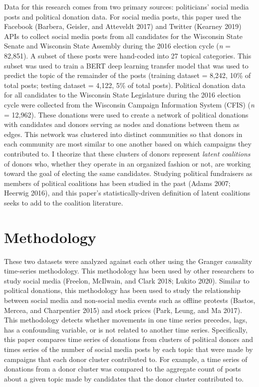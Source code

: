 \documentclass[12pt,]{article}
\begin{document}
Data for this research comes from two primary sources: politicians'
social media posts and political donation data. For social media posts,
this paper used the Facebook (Barbera, Geisler, and Atteveldt 2017) and
Twitter (Kearney 2019) APIs to collect social media posts from all
candidates for the Wisconsin State Senate and Wisconsin State Assembly
during the 2016 election cycle (\emph{n} = 82,851). A subset of these
posts were hand-coded into 27 topical categories. This subset was used
to train a BERT deep learning transfer model that was used to predict
the topic of the remainder of the posts (training dataset = 8,242, 10\%
of total posts; testing dataset = 4,122, 5\% of total posts). Political
donation data for all candidates to the Wisconsin State Legislature
during the 2016 election cycle were collected from the Wisconsin
Campaign Information System (CFIS) (\emph{n} = 12,962). These donations
were used to create a network of political donations with candidates and
donors serving as nodes and donations between them as edges. This
network was clustered into distinct communities so that donors in each
community are most similar to one another based on which campaigns they
contributed to. I theorize that these clusters of donors represent
\emph{latent coalitions} of donors who, whether they operate in an
organized fashion or not, are working toward the goal of electing the
same candidates. Studying political fundraisers as members of political
coalitions has been studied in the past (Adams 2007; Heerwig 2016), and
this paper's statistically-driven definition of latent coalitions seeks
to add to the coalition literature.

\hypertarget{methodology}{%
\section{Methodology}\label{methodology}}

These two datasets were analyzed against each other using the Granger
causality time-series methodology. This methodology has been used by
other researchers to study social media (Freelon, McIlwain, and Clark
2018; Lukito 2020). Similar to political donations, this methodology has
been used to study the relationship between social media and non-social
media events such as offline protests (Bastos, Mercea, and Charpentier
2015) and stock prices (Park, Leung, and Ma 2017). This methodology
detects whether movements in one time series precedes, lags, has a
confounding variable, or is not related to another time series.
Specifically, this paper compares time series of donations from clusters
of political donors and times series of the number of social media posts
by each topic that were made by campaigns that each donor cluster
contributed to. For example, a time series of donations from a donor
cluster was compared to the aggregate count of posts about a given topic
made by candidates that the donor cluster contributed to.
\end{document}
